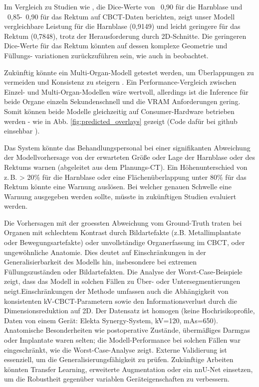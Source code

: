 \documentclass{article}
\begin{document}
Im Vergleich zu Studien wie \citep{radici2024}, die Dice-Werte von ~0,90 für die
Harnblase und ~0,85-~0,90 für das Rektum auf CBCT-Daten berichten, zeigt unser Modell
vergleichbare Leistung für die Harnblase (0,9149) und leicht geringere für das
Rektum (0,7848), trotz der Herausforderung durch 2D-Schnitte. Die geringeren
Dice-Werte für das Rektum könnten auf dessen komplexe Geometrie und Füllungs-
variationen zurückzuführen sein, wie auch in \citep{rayed2024} beobachtet.

Zukünftig könnte ein Multi-Organ-Modell getestet werden, um Überlappungen zu
vermeiden und Konsistenz zu steigern \citep{wasserthal2023}. Ein
Performance-Vergleich zwischen Einzel- und Multi-Organ-Modellen wäre wertvoll,
allerdings ist die Inference für beide Organe einzeln Sekundenschnell und die
VRAM Anforderungen gering. Somit können beide Modelle gleichzeitig auf
Consumer-Hardware betrieben werden - wie in Abb. \ref{fig:predicted_overlays}
gezeigt (Code dafür bei github einsehbar \cite{rhone_repo}).

Das System könnte das Behandlungspersonal bei einer signifikanten Abweichung
der Modellvorhersage von der erwarteten Größe oder Lage der Harnblase oder des
Rektums warnen (abgeleitet aus dem Planungs-CT). Ein Höhenunterschied von
z.\,B. > 20\% für die Harnblase oder eine Flächenüberlappung unter 80\% für das
Rektum könnte eine Warnung auslösen. Bei welcher genauen Schwelle eine Warnung
ausgegeben werden sollte, müsste in zukünftigen Studien evaluiert werden.

Die Vorhersagen mit der groessten Abweichung vom Ground-Truth traten bei
Organen mit schlechtem Kontrast durch Bildartefakte (z.B. Metallimplantate oder
Bewegungsartefakte) oder unvollständige Organerfassung im CBCT, oder
ungewöhnliche Anatomie. Dies deutet auf Einschränkungen in der
Generalisierbarkeit des Modells hin, insbesondere bei extremen
Füllungszuständen oder Bildartefakten. Die Analyse der Worst-Case-Beispiele
zeigt, dass das Modell in solchen Fällen zu Über- oder Untersegmentierungen
neigt.Einschränkungen der Methode umfassen auch die Abhängigkeit von
konsistenten kV-CBCT-Parametern sowie den Informationsverlust durch die
Dimensionsreduktion auf 2D. Der Datensatz ist homogen (keine Hochrisikoprofile,
Daten von einem Gerät: Elekta Synergy-System, kV=120, mAs=650). Anatomische
Besonderheiten wie postoperative Zustände, übermäßiges Darmgas oder Implantate
waren selten; die Modell-Performance bei solchen Fällen war eingeschränkt, wie
die Worst-Case-Analyse zeigt. Externe Validierung ist essenziell, um die
Generalisierungsfähigkeit zu prüfen. Zukünftige Arbeiten könnten Transfer
Learning, erweiterte Augmentation oder ein nnU-Net einsetzen, um die Robustheit
gegenüber variablen Geräteigenschaften zu verbessern.
 
\end{document}
